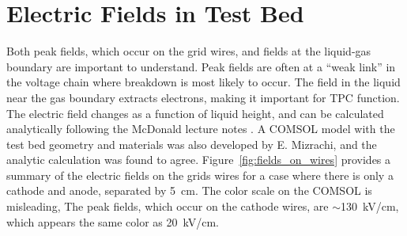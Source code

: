 \section{Electric Fields in Test Bed}
Both peak fields, which occur on the grid wires, and fields at the liquid-gas boundary are important to understand. Peak fields are often at a ``weak link'' in the voltage chain where breakdown is most likely to occur. The field in the liquid near the gas boundary extracts electrons, making it important for \ac{TPC} function. The electric field changes as a function of liquid height, and can be calculated analytically following the McDonald lecture notes \cite{McDonald2003}. A COMSOL model with the test bed geometry and materials was also developed by E. Mizrachi, and the analytic calculation was found to agree. Figure~\ref{fig:fields_on_wires} provides a summary of the electric fields on the grids wires for a case where there is only a cathode and anode, separated by 5~cm. The color scale on the COMSOL is misleading, The peak fields, which occur on the cathode wires, are $\sim$130~kV/cm, which appears the same color as 20~kV/cm.

